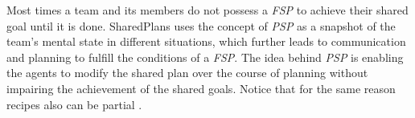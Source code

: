\documentclass[12pt]{report}
\begin{document}
% 

Most times a team and its members do not possess a \textit{FSP} to achieve
their shared goal until it is done. SharedPlans uses the concept of \textit{PSP}
as a snapshot of the team's mental state in different situations, which further
leads to communication and planning to fulfill the conditions of a \textit{FSP}.
The idea behind \textit{PSP} is enabling the agents to modify the shared plan
over the course of planning without impairing the achievement of the shared
goals. Notice that for the same reason recipes also can be partial
\cite{grosz:collaboration, grosz:plans-discourse}.
\end{document}
